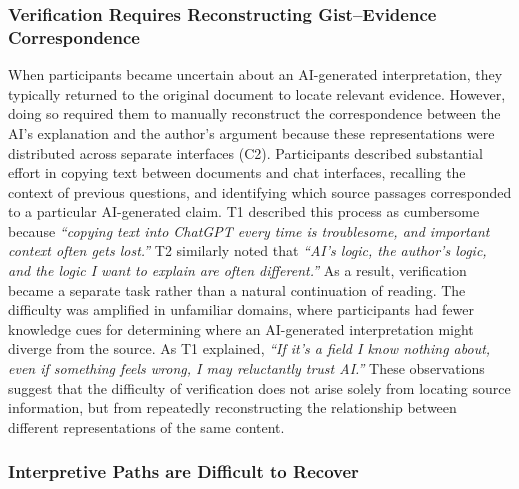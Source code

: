 \documentclass[manuscript,review,anonymous]{acmart}
\begin{document}
\subsubsection{\textbf{Verification Requires Reconstructing Gist--Evidence Correspondence}}
\label{sec:rupture2}

When participants became uncertain about an AI-generated interpretation, they typically returned to the original document to locate relevant evidence. However, doing so required them to manually reconstruct the correspondence between the AI's explanation and the author's argument because these representations were distributed across separate interfaces (C2). Participants described substantial effort in copying text between documents and chat interfaces, recalling the context of previous questions, and identifying which source passages corresponded to a particular AI-generated claim. T1 described this process as cumbersome because \textit{``copying text into ChatGPT every time is troublesome, and important context often gets lost.''} T2 similarly noted that \textit{``AI's logic, the author's logic, and the logic I want to explain are often different.''} As a result, verification became a separate task rather than a natural continuation of reading. The difficulty was amplified in unfamiliar domains, where participants had fewer knowledge cues for determining where an AI-generated interpretation might diverge from the source. As T1 explained, \textit{``If it's a field I know nothing about, even if something feels wrong, I may reluctantly trust AI.''} These observations suggest that the difficulty of verification does not arise solely from locating source information, but from repeatedly reconstructing the relationship between different representations of the same content.

\subsubsection{\textbf{Interpretive Paths are Difficult to Recover}}
\label{sec:rupture3}
\end{document}
